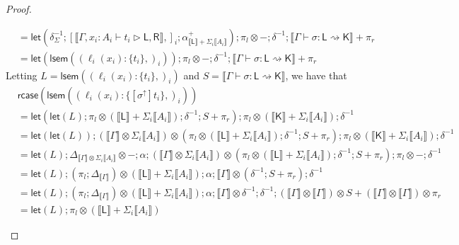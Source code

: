 \documentclass[acmsmall,screen,review]{acmart}
\newcommand{\ms}[1]{\ensuremath{\mathsf{#1}}}
\newcommand{\lto}{:}
\newcommand{\wbranch}[3]{#1(#2) \lto \{#3\}}
\newcommand{\upg}[1]{{#1}^\uparrow}
\newcommand{\bhyp}[2]{#1 : #2}
\newcommand{\haslb}[3]{#1 \vdash #2 \rhd #3}
\newcommand{\lbsubst}[4]{#1 \vdash #2: #3 \rightsquigarrow #4}
\newcommand{\dnt}[1]{\llbracket{#1}\rrbracket}
\newcommand{\dmor}[1]{{\Delta}_{#1}}
\newcommand{\loopmor}[1]{\ms{lsem}(#1)}
\newcommand{\lmor}[1]{\ms{let}(#1)}
\newcommand{\rcase}[1]{\ms{rcase}(#1)}
\begin{document}
\begin{proof}
\begin{itemize}[leftmargin=*]
\begin{equation}
\begin{aligned}
        & = \lmor{
          \delta^{-1}_{\Sigma}
            ; [\dnt{\haslb{\Gamma, \bhyp{x_i}{A_i}}{t_i}{\ms{L}, \ms{R}}},]_i 
            ; \alpha^+_{\dnt{\ms{L}} + \Sigma_i \dnt{A_i}}
            } 
          ; \pi_l \otimes -
          ; \delta^{-1} 
          ; \dnt{\lbsubst{\Gamma}{\sigma}{\ms{L}}{\ms{K}}} + \pi_r \\
        & = \lmor{\loopmor{(\wbranch{\ell_i}{x_i}{t_i},)_i}} 
          ; \pi_l \otimes -
          ; \delta^{-1} 
          ; \dnt{\lbsubst{\Gamma}{\sigma}{\ms{L}}{\ms{K}}} + \pi_r
      \end{aligned}
    \end{equation}
    Letting $L = \loopmor{(\wbranch{\ell_i}{x_i}{t_i},)_i}$ and
    $S = \dnt{\lbsubst{\Gamma}{\sigma}{\ms{L}}{\ms{K}}}$, we have that
    \begin{equation}
      \begin{aligned}
        & \rcase{\loopmor{(\wbranch{\ell_i}{x_i}{[\upg{\sigma}]t_i},)_i}} \\
        & = \lmor{
            \lmor{L} 
            ; \pi_l \otimes (\dnt{\ms{L}} + \Sigma_i\dnt{A_i})
            ; \delta^{-1} ; S + \pi_r}
          ; \pi_l \otimes (\dnt{\ms{K}} + \Sigma_i\dnt{A_i}) ; \delta^{-1}
          \\
        & = \lmor{\lmor{L}} 
          ; (\dnt{\Gamma} \otimes \Sigma_i\dnt{A_i}) 
            \otimes (\pi_l \otimes (\dnt{\ms{L}} + \Sigma_i\dnt{A_i}) ; \delta^{-1} ; S + \pi_r)
          ; \pi_l \otimes (\dnt{\ms{K}} + \Sigma_i\dnt{A_i}) ; \delta^{-1} \\
        & = \lmor{L}
          ; \dmor{\dnt{\Gamma} \otimes \Sigma_i\dnt{A_i}} \otimes -
          ; \alpha
          ; (\dnt{\Gamma} \otimes \Sigma_i\dnt{A_i}) 
          \otimes (\pi_l \otimes (\dnt{\ms{L}} + \Sigma_i\dnt{A_i}) ; \delta^{-1} ; S + \pi_r)
          ; \pi_l \otimes - ; \delta^{-1} \\
        & = \lmor{L}
          ; (\pi_l ; \dmor{\dnt{\Gamma}}) \otimes (\dnt{\ms{L}} + \Sigma_i\dnt{A_i})
          ; \alpha
          ; \dnt{\Gamma}
          \otimes (\delta^{-1} ; S + \pi_r)
          ; \delta^{-1} \\
        & = \lmor{L}
          ; (\pi_l ; \dmor{\dnt{\Gamma}}) \otimes (\dnt{\ms{L}} + \Sigma_i\dnt{A_i})
          ; \alpha
          ; \dnt{\Gamma}
          \otimes \delta^{-1}
          ; \delta^{-1} 
          ; (\dnt{\Gamma} \otimes \dnt{\Gamma}) \otimes S 
            + (\dnt{\Gamma} \otimes \dnt{\Gamma}) \otimes \pi_r \\
        & = \lmor{L} ; \pi_l \otimes (\dnt{\ms{L}} + \Sigma_i\dnt{A_i})

\end{aligned}
\end{equation}
\end{itemize}
\end{proof}
\end{document}
